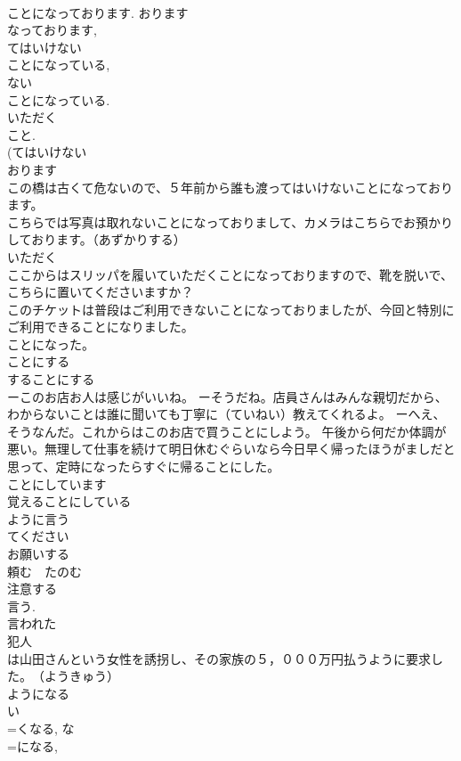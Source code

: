\documentclass[8pt]{extreport}
\begin{document}
\begin{CJK}{UTF8}{min}
\\	ことになっております. おります 
\\	なっております, 
\\	てはいけない
\\	ことになっている, 
\\	ない
\\	ことになっている. 
\\	いただく 
\\	こと. 
\\	(てはいけない 
\\	おります 
\\	この橋は古くて危ないので、５年前から誰も渡ってはいけないことになっております。 
\\	こちらでは写真は取れないことになっておりまして、カメラはこちらでお預かりしております。（あずかりする） 
\\	いただく 
\\	ここからはスリッパを履いていただくことになっておりますので、靴を脱いで、こちらに置いてくださいますか？ 
\\	このチケットは普段はご利用できないことになっておりましたが、今回と特別にご利用できることになりました。 
\\	ことになった。 
\\	ことにする 
\\	することにする 
\\	ーこのお店お人は感じがいいね。 ーそうだね。店員さんはみんな親切だから、わからないことは誰に聞いても丁寧に（ていねい）教えてくれるよ。 ーへえ、そうなんだ。これからはこのお店で買うことにしよう。 午後から何だか体調が悪い。無理して仕事を続けて明日休むぐらいなら今日早く帰ったほうがましだと思って、定時になったらすぐに帰ることにした。 
\\	ことにしています 
\\	覚えることにしている　
\\	ように言う	
\\	てください　
\\	お願いする
\\	頼む　たのむ 
\\	注意する 
\\	言う. 
\\	言われた　
\\	犯人
\\	は山田さんという女性を誘拐し、その家族の５，０００万円払うように要求した。　（ようきゅう） 
\\	ようになる 
\\	い
\\	=くなる, な
\\	=になる, 

\end{CJK}
\end{document}
